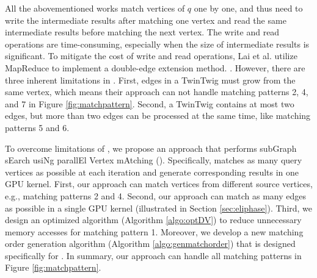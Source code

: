 All the abovementioned works match vertices of $q$ one by one, and thus need to write the intermediate results after matching one vertex and read the same intermediate results before matching the next vertex. The write and read operations are time-consuming, especially when the size of intermediate results is significant. To mitigate the cost of write and read operations, Lai et al. \cite{lai2015scalable} utilize MapReduce to implement a double-edge extension method. . However, there are three inherent limitations in \cite{lai2015scalable}. First, edges in a TwinTwig must grow from the same vertex, which means their approach can not handle matching patterns 2, 4, and 7 in Figure \ref{fig:matchpattern}. Second, a TwinTwig contains at most two edges, but more than two edges can be processed at the same time, like matching patterns 5 and 6. 

To overcome limitations of \cite{lai2015scalable}, we propose an approach that performs subGraph sEarch usiNg parallEl Vertex mAtching (\SystemName).  Specifically, \SystemName matches as many query vertices as possible at each iteration and generate corresponding results in one GPU kernel. First, our approach can match vertices from different source vertices, e.g., matching patterns 2 and 4. Second, our approach can match as many edges as possible in a single GPU kernel (illustrated in Section \ref{sec:eliphase}). Third, we design an optimized algorithm (Algorithm \ref{algo:optDV}) to reduce unnecessary memory accesses for matching pattern 1. Moreover, we develop a new matching order generation algorithm (Algorithm \ref{algo:genmatchorder}) that is designed specifically for \SystemName. In summary, our approach can handle all matching patterns in Figure \ref{fig:matchpattern}.

